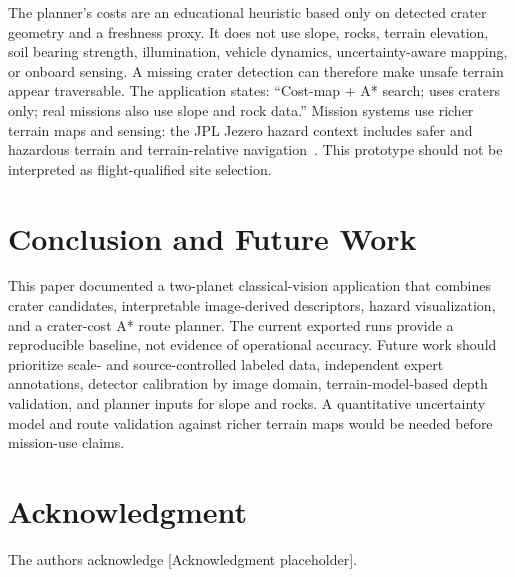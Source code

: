 \documentclass[conference]{IEEEtran}
\begin{document}
The planner's costs are an educational heuristic based only on detected crater geometry and a freshness proxy. It does not use slope, rocks, terrain elevation, soil bearing strength, illumination, vehicle dynamics, uncertainty-aware mapping, or onboard sensing. A missing crater detection can therefore make unsafe terrain appear traversable. The application states: ``Cost-map + A* search; uses craters only; real missions also use slope and rock data.'' Mission systems use richer terrain maps and sensing: the JPL Jezero hazard context includes safer and hazardous terrain and terrain-relative navigation~\cite{jplJezero}. This prototype should not be interpreted as flight-qualified site selection.

\section{Conclusion and Future Work}
This paper documented a two-planet classical-vision application that combines crater candidates, interpretable image-derived descriptors, hazard visualization, and a crater-cost A* route planner. The current exported runs provide a reproducible baseline, not evidence of operational accuracy. Future work should prioritize scale- and source-controlled labeled data, independent expert annotations, detector calibration by image domain, terrain-model-based depth validation, and planner inputs for slope and rocks. A quantitative uncertainty model and route validation against richer terrain maps would be needed before mission-use claims.

\section*{Acknowledgment}
The authors acknowledge [Acknowledgment placeholder].



\end{document}
